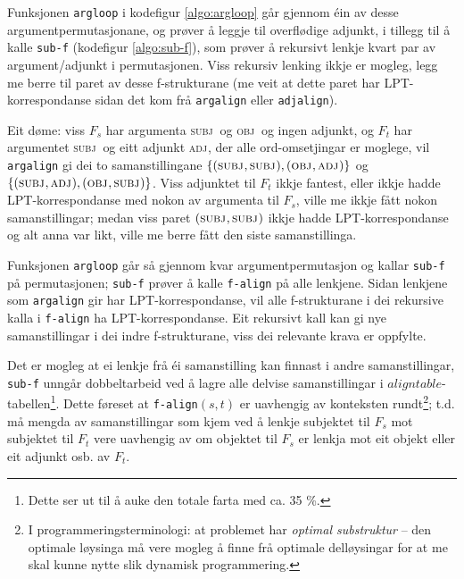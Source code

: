 \documentclass[12pt,a4paper,oneside,draft]{report}
\newcommand{\F}[2]{\textsc{#1}\ensuremath{_{#2}}}
\newcommand{\OBJ}{\F{obj}{}}
\newcommand{\OBJs}{\F{obj~}{}}
\newcommand{\ADJ}{\F{adj}{}}
\newcommand{\SUBJ}{\F{subj}{}}
\newcommand{\SUBJs}{\F{subj~}{}}
\begin{document}
 Funksjonen \texttt{argloop} i kodefigur \ref{algo:argloop} går gjennom éin
 av desse argumentpermutasjonane, og prøver å leggje til overflødige
 adjunkt, i tillegg til å kalle \texttt{sub-f} (kodefigur \ref{algo:sub-f}),
 som prøver å rekursivt lenkje kvart par av argument/adjunkt i
 permutasjonen. Viss rekursiv lenking ikkje er mogleg, legg me berre
 til paret av desse f-strukturane (me veit at dette paret har
 LPT\hyp{}korrespondanse sidan det kom frå \texttt{argalign} eller
 \texttt{adjalign}).

 Eit døme: viss $F_s$ har argumenta \SUBJs og \OBJs og ingen adjunkt,
 og $F_t$ har argumentet \SUBJs og eitt adjunkt \ADJ, der alle
 ord-omsetjingar er moglege, vil \texttt{argalign} gi dei to samanstillingane
 $\{(\SUBJ,\SUBJ), (\OBJ,\ADJ)\}$ og $\{(\SUBJ,\ADJ),
 (\OBJ,\SUBJ)\}$. Viss adjunktet til $F_t$ ikkje fantest, eller ikkje
 hadde LPT\hyp{}korrespondanse med nokon av argumenta til $F_s$, ville me
 ikkje fått nokon samanstillingar; medan viss paret $(\SUBJ,\SUBJ)$
 ikkje hadde LPT\hyp{}korrespondanse og alt anna var likt, ville me berre
 fått den siste samanstillinga.

 Funksjonen \texttt{argloop} går så gjennom kvar argumentpermutasjon og
 kallar \texttt{sub-f} på permutasjonen; \texttt{sub-f} prøver å kalle \texttt{f-align} på
 alle lenkjene. Sidan lenkjene som \texttt{argalign} gir har
 LPT\hyp{}korrespondanse, vil alle f\hyp{}strukturane i dei rekursive kalla i
 \texttt{f-align} ha LPT\hyp{}korrespondanse. Eit rekursivt kall kan gi nye
 samanstillingar i dei indre f\hyp{}strukturane, viss dei relevante krava
 er oppfylte.

 Det er mogleg at ei lenkje frå éi samanstilling kan finnast i andre
 samanstillingar, \texttt{sub-f} unngår dobbeltarbeid ved å lagre alle
 delvise samanstillingar i $aligntable$-tabellen\footnote{Dette ser ut til å auke den totale farta med ca. 35 \%. }. Dette føreset
 at \texttt{f-align}$(s,t)$ er uavhengig av konteksten rundt\footnote{I programmeringsterminologi: at problemet har \emph{optimal         substruktur} -- den optimale løysinga må vere mogleg å finne
        frå optimale delløysingar for at me skal kunne nytte slik
        dynamisk programmering. };
 t.d. må mengda av samanstillingar som kjem ved å lenkje subjektet til
 $F_s$ mot subjektet til $F_t$ vere uavhengig av om objektet til $F_s$
 er lenkja mot eit objekt eller eit adjunkt osb. av $F_t$.
\end{document}
